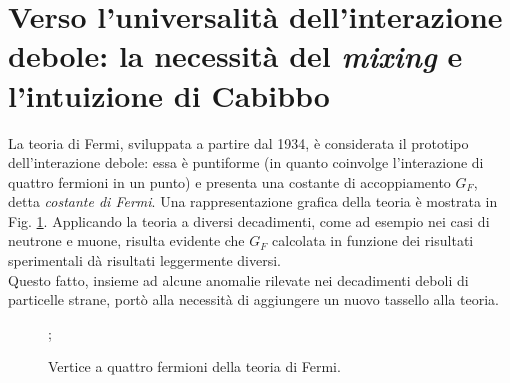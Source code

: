 \documentclass{subnucbo}
\begin{document}
\section{Verso l'universalità dell'interazione debole: la necessità del \textit{mixing} e l'intuizione di Cabibbo}
La teoria di Fermi, sviluppata a partire dal 1934, è considerata il prototipo dell'interazione debole: essa è puntiforme (in quanto coinvolge l'interazione di quattro fermioni in un punto) e presenta una costante di accoppiamento $G_{F}$, detta \textit{costante di Fermi}. Una rappresentazione grafica della teoria è mostrata in Fig. \ref{fig:fermi_decay}. Applicando la teoria a diversi decadimenti, come ad esempio nei casi di neutrone e muone, risulta evidente che $G_{F}$ calcolata in funzione dei risultati sperimentali dà risultati leggermente diversi. \\
Questo fatto, insieme ad alcune anomalie rilevate nei decadimenti deboli di particelle strane, portò alla necessità di aggiungere un nuovo tassello alla teoria.
\begin{figure}[!h]
        \centering
        ;
        \caption{Vertice a quattro fermioni della teoria di Fermi.}
        \label{fig:fermi_decay}
\end{figure}
\end{document}
